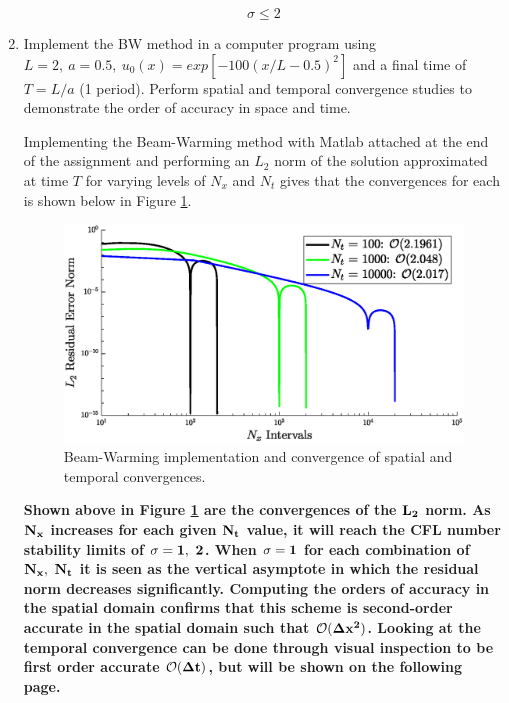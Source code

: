 \begin{enumerate}[label=\alph*., start = 1]
    \vspace{-0.5in}
    \begin{equation*}
        \boxed{\sigma \le 2}
    \end{equation*}


    \pagebreak
    \item Implement the BW method in a computer program using $L= 2,\ a= 0.5,\ u_0(x) = exp[-100(x/L-0.5)^2]$ and a final time of $T=L/a$ (1 period).  Perform spatial and temporal convergence studies to demonstrate the order of accuracy in space and time.
    
    Implementing the Beam-Warming method with Matlab attached at the end of the assignment and performing an $L_2$ norm of the solution approximated at time $T$ for varying levels of $N_x$ and $N_t$ gives that the convergences for each is shown below in Figure \ref{fig:q2_BW}.

    \begin{figure}[h]
        \centering
        \includegraphics[width = 0.9\linewidth]{q2/BW_convergence.eps}
        \caption{Beam-Warming implementation and convergence of spatial and temporal convergences.}
        \label{fig:q2_BW}
    \end{figure}


    \begin{fminipage}{0.9\linewidth}
        \textbf{Shown above in Figure \ref{fig:q2_BW} are the convergences of the $\bf L_2$ norm. As $\bf N_x$ increases for each given $\bf N_t$ value, it will reach the CFL number stability limits of $\bf \sigma = 1,\ 2$. When $\bf \sigma = 1$ for each combination of $\bf N_x,\ N_t$ it is seen as the vertical asymptote in which the residual norm decreases significantly. Computing the orders of accuracy in the spatial domain confirms that this scheme is second-order accurate in the spatial domain such that $\bf \mathcal{O}(\Delta x^2)$. Looking at the temporal convergence can be done through visual inspection to be first order accurate $\bf \mathcal{O}(\Delta t)$, but will be shown on the following page.}
    \end{fminipage}


\end{enumerate}
